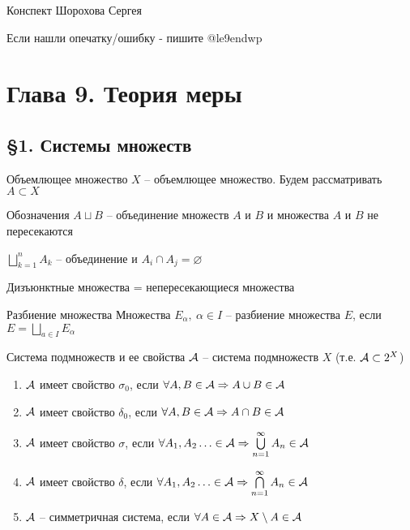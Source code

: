 \documentclass[12pt]{article}
\begin{document}
\begin{flushright}
    Конспект Шорохова Сергея

    Если нашли опечатку/ошибку - пишите @le9endwp 
\end{flushright}

\tableofcontents
\newpage

\section{Глава 9. Теория меры}

\subsection{§1. Системы множеств}

\begin{defin}{Объемлющее множество}
    $X$ -- объемлющее множество. Будем рассматривать $A \subset X$
\end{defin}

\begin{declar}{Обозначения}
    $A \sqcup B$ -- объединение множеств $A$ и $B$ и множества $A$ и $B$ не пересекаются

    $\bigsqcup\limits_{k = 1}^n A_k$ -- объединение и $A_i \cap A_j = \varnothing$

    Дизъюнктные множества = непересекающиеся множества
\end{declar}

\begin{defin}{Разбиение множества}
    Множества $E_\alpha,\ \alpha \in I$ -- разбиение множества $E$, если $E = \bigsqcup\limits_{a \in I} E_\alpha$
\end{defin}

\begin{defin}{Система подмножеств и ее свойства}
    $\mathcal{A}$ -- система подмножеств $X$ (т.е. $\mathcal{A} \subset 2^X$)

    \begin{enumerate}
        \item $\mathcal{A}$ имеет свойство $\sigma_0$, если $\forall A, B \in \mathcal{A} \Rightarrow A \cup B \in \mathcal{A}$
        \item $\mathcal{A}$ имеет свойство $\delta_0$, если $\forall A, B \in \mathcal{A} \Rightarrow A \cap B \in \mathcal{A}$
        \item $\mathcal{A}$ имеет свойство $\sigma$, если $\forall A_1, A_2 \ldots \in \mathcal{A} \Rightarrow \bigcup\limits_{n = 1}^\infty A_n \in \mathcal{A}$
        \item $\mathcal{A}$ имеет свойство $\delta$, если $\forall A_1, A_2 \ldots \in \mathcal{A} \Rightarrow \bigcap\limits_{n = 1}^\infty A_n \in \mathcal{A}$
        \item $\mathcal{A}$ -- симметричная система, если $\forall A \in \mathcal{A} \Rightarrow X \setminus A \in \mathcal{A}$
    \end{enumerate}
\end{defin}
\end{document}
